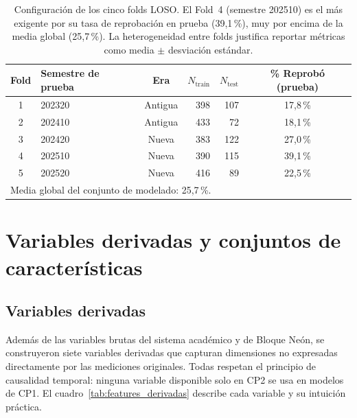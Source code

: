 \documentclass[12pt, letterpaper, openany]{report}
\begin{document}
\begin{table}[htbp]
  \centering
  \caption{Configuración de los cinco folds LOSO. El Fold~4 (semestre 
  202510) es el más exigente por su tasa de reprobación en prueba 
  (39,1\,\%), muy por encima de la media global (25,7\,\%). La 
  heterogeneidad entre folds justifica reportar métricas como media 
  $\pm$ desviación estándar.}
  \label{tab:loso_folds}
  \small
  \begin{tabular}{clcrrc}
    \toprule
    Fold & Semestre de prueba & Era & $N_\text{train}$ & $N_\text{test}$ 
    & \% Reprobó (prueba) \\
    \midrule
    1 & 202320 & Antigua & 398 & 107 & 17,8\,\% \\
    2 & 202410 & Antigua & 433 &  72 & 18,1\,\% \\
    3 & 202420 & Nueva   & 383 & 122 & 27,0\,\% \\
    4 & 202510 & Nueva   & 390 & 115 & 39,1\,\% \\
    5 & 202520 & Nueva   & 416 &  89 & 22,5\,\% \\
    \bottomrule
    \multicolumn{6}{l}{\footnotesize Media global del conjunto de 
    modelado: 25,7\,\%.} \\
  \end{tabular}
\end{table}

\section{Variables derivadas y conjuntos de características}

\subsection{Variables derivadas}

Además de las variables brutas del sistema académico y de Bloque Neón, se construyeron siete variables derivadas que capturan dimensiones no expresadas directamente por las mediciones originales. Todas respetan el principio de causalidad temporal: ninguna variable disponible solo en CP2 se usa en modelos de CP1. El cuadro~\ref{tab:features_derivadas} describe cada variable y su intuición práctica.
\end{document}
